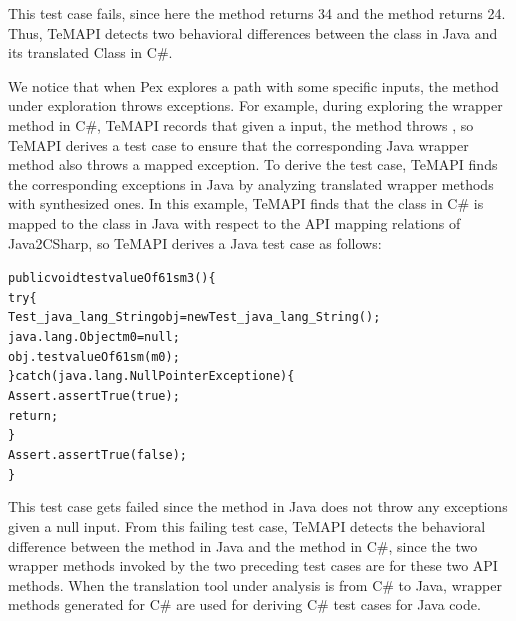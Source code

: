 This test case fails, since here the  method returns 34 and the  method returns 24. Thus, TeMAPI detects two behavioral differences between the  class in Java and its translated Class in C\#.


We notice that when Pex explores a path with some specific inputs, the method under exploration throws exceptions.
For example, during exploring the  wrapper method in C\#, TeMAPI records that given a  input, the method throws , so TeMAPI derives a test case to ensure that the corresponding Java wrapper method also throws a mapped exception. To derive the test case, TeMAPI finds the corresponding exceptions in Java by analyzing translated wrapper methods with synthesized ones. In this example, TeMAPI finds that the  class in C\# is mapped to the  class in Java with respect to the API mapping relations of Java2CSharp, so TeMAPI derives a Java test case as follows:

\begin{CodeOut}\vspace*{-1.5ex}
\begin{alltt}
 public void testvalueOf61sm3()\{
   try\{
     Test_java_lang_String obj = new Test_java_lang_String();
     java.lang.Object m0 = null;
     obj.testvalueOf61sm(m0);
   \}catch(java.lang.NullPointerException e)\{
     Assert.assertTrue(true);
     return;
   \}
   Assert.assertTrue(false);
 \}
\end{alltt}
\end{CodeOut}\vspace*{-1ex}

This test case gets failed since the  method in Java does not throw any exceptions given a null input.
From this failing test case, TeMAPI detects the behavioral difference between the  method in Java and the  method in C\#, since the two wrapper methods invoked by the two preceding test cases are for these two API methods. When the translation tool under analysis is from C\# to Java, wrapper methods generated for C\# are used for deriving C\# test cases for Java code.

